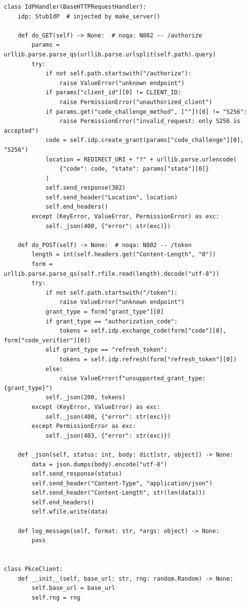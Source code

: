 \begin{verbatim}
class IdPHandler(BaseHTTPRequestHandler):
    idp: StubIdP  # injected by make_server()

    def do_GET(self) -> None:  # noqa: N802 -- /authorize
        params = urllib.parse.parse_qs(urllib.parse.urlsplit(self.path).query)
        try:
            if not self.path.startswith("/authorize"):
                raise ValueError("unknown endpoint")
            if params["client_id"][0] != CLIENT_ID:
                raise PermissionError("unauthorized_client")
            if params.get("code_challenge_method", [""])[0] != "S256":
                raise PermissionError("invalid_request: only S256 is accepted")
            code = self.idp.create_grant(params["code_challenge"][0], "S256")
            location = REDIRECT_URI + "?" + urllib.parse.urlencode(
                {"code": code, "state": params["state"][0]}
            )
            self.send_response(302)
            self.send_header("Location", location)
            self.end_headers()
        except (KeyError, ValueError, PermissionError) as exc:
            self._json(400, {"error": str(exc)})

    def do_POST(self) -> None:  # noqa: N802 -- /token
        length = int(self.headers.get("Content-Length", "0"))
        form = urllib.parse.parse_qs(self.rfile.read(length).decode("utf-8"))
        try:
            if not self.path.startswith("/token"):
                raise ValueError("unknown endpoint")
            grant_type = form["grant_type"][0]
            if grant_type == "authorization_code":
                tokens = self.idp.exchange_code(form["code"][0], form["code_verifier"][0])
            elif grant_type == "refresh_token":
                tokens = self.idp.refresh(form["refresh_token"][0])
            else:
                raise ValueError(f"unsupported_grant_type: {grant_type}")
            self._json(200, tokens)
        except (KeyError, ValueError) as exc:
            self._json(400, {"error": str(exc)})
        except PermissionError as exc:
            self._json(403, {"error": str(exc)})

    def _json(self, status: int, body: dict[str, object]) -> None:
        data = json.dumps(body).encode("utf-8")
        self.send_response(status)
        self.send_header("Content-Type", "application/json")
        self.send_header("Content-Length", str(len(data)))
        self.end_headers()
        self.wfile.write(data)

    def log_message(self, format: str, *args: object) -> None:
        pass


class PkceClient:
    def __init__(self, base_url: str, rng: random.Random) -> None:
        self.base_url = base_url
        self.rng = rng


\end{verbatim}
